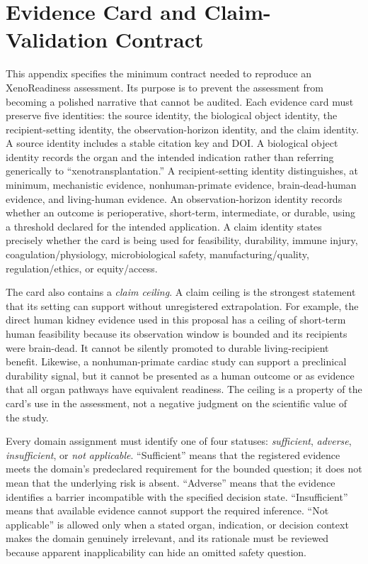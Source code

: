 \documentclass[conference]{IEEEtran}
\begin{document}
\appendices
\section{Evidence Card and Claim-Validation Contract}

This appendix specifies the minimum contract needed to reproduce an XenoReadiness assessment. Its purpose is to prevent the assessment from becoming a polished narrative that cannot be audited. Each evidence card must preserve five identities: the source identity, the biological object identity, the recipient-setting identity, the observation-horizon identity, and the claim identity. A source identity includes a stable citation key and DOI. A biological object identity records the organ and the intended indication rather than referring generically to ``xenotransplantation.'' A recipient-setting identity distinguishes, at minimum, mechanistic evidence, nonhuman-primate evidence, brain-dead-human evidence, and living-human evidence. An observation-horizon identity records whether an outcome is perioperative, short-term, intermediate, or durable, using a threshold declared for the intended application. A claim identity states precisely whether the card is being used for feasibility, durability, immune injury, coagulation/physiology, microbiological safety, manufacturing/quality, regulation/ethics, or equity/access.

The card also contains a \emph{claim ceiling}. A claim ceiling is the strongest statement that its setting can support without unregistered extrapolation. For example, the direct human kidney evidence used in this proposal has a ceiling of short-term human feasibility because its observation window is bounded and its recipients were brain-dead. It cannot be silently promoted to durable living-recipient benefit. Likewise, a nonhuman-primate cardiac study can support a preclinical durability signal, but it cannot be presented as a human outcome or as evidence that all organ pathways have equivalent readiness. The ceiling is a property of the card's use in the assessment, not a negative judgment on the scientific value of the study.

Every domain assignment must identify one of four statuses: \emph{sufficient}, \emph{adverse}, \emph{insufficient}, or \emph{not applicable}. ``Sufficient'' means that the registered evidence meets the domain's predeclared requirement for the bounded question; it does not mean that the underlying risk is absent. ``Adverse'' means that the evidence identifies a barrier incompatible with the specified decision state. ``Insufficient'' means that available evidence cannot support the required inference. ``Not applicable'' is allowed only when a stated organ, indication, or decision context makes the domain genuinely irrelevant, and its rationale must be reviewed because apparent inapplicability can hide an omitted safety question.
\end{document}
